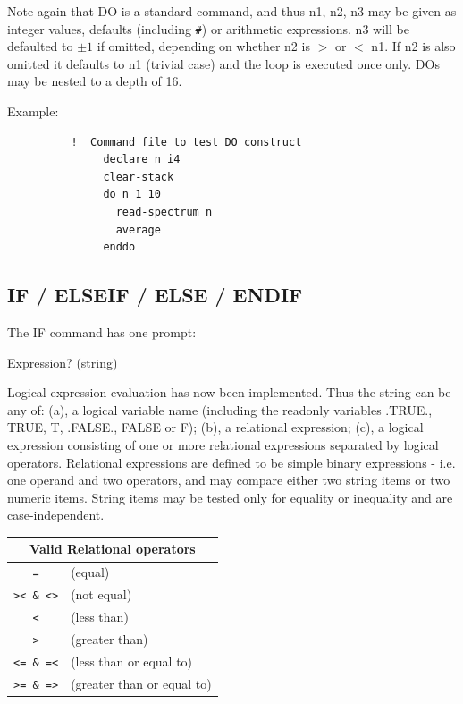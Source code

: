 \documentclass[11pt,twoside]{report}
\begin{document}
Note again that DO is a standard command, and thus n1, n2, n3 may be given as
integer values, defaults (including \verb+#+) or arithmetic expressions. n3 will be
defaulted to $\pm 1$ if omitted, depending on whether n2 is $>$ or $<$ n1. If n2 is also
omitted it defaults to n1 (trivial case) and the loop is executed once only. DOs
may be nested to a depth of 16.

Example:   
\begin{verbatim}
          !  Command file to test DO construct
               declare n i4
               clear-stack
               do n 1 10
                 read-spectrum n
                 average
               enddo
\end{verbatim}


\subsection{IF / ELSEIF / ELSE / ENDIF}

The IF command has one prompt:
\begin{description}
\item{}               Expression?    (string)
\end{description}
Logical expression evaluation has now been
implemented. Thus the string can be any of: (a), a logical variable name
(including the readonly variables .TRUE., TRUE, T, .FALSE., FALSE or F); (b), a
relational expression; (c), a logical
expression consisting of one or more relational expressions separated by
logical operators. Relational expressions are defined to be simple binary
expressions - i.e. one operand and two operators, and may compare either two
string items or two numeric items. String items may be tested only for equality
or inequality and are case-independent. 

\begin{center}
\begin{tabular}{|cl|} \hline
               \multicolumn{2}{|c|}{Valid Relational operators} \\ \hline
               \verb$=$          & (equal) \\
               \verb$>< & <>$    & (not equal) \\
               \verb$<$          & (less than) \\
               \verb$>$          & (greater than) \\
               \verb$<= & =<$    & (less than or equal to) \\
               \verb$>= & =>$    & (greater than or equal to) \\ \hline
\end{tabular}
\end{center}
\end{document}
